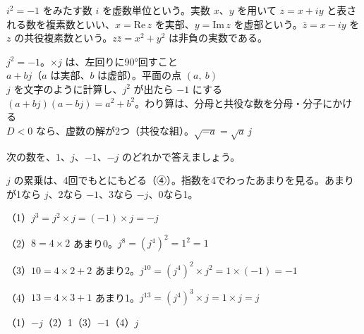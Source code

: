 \begin{senmonsho}[大学の教科書ふうの書き方]
\begin{bkhonbun}
$i^2=-1$ をみたす数 $i$ を虚数単位という。実数 $x$、$y$ を用いて $z=x+iy$ と表される数を複素数といい、$x=\mathrm{Re}\,z$ を実部、$y=\mathrm{Im}\,z$ を虚部という。$\bar z=x-iy$ を $z$ の共役複素数という。$z\bar z=x^2+y^2$ は非負の実数である。
\end{bkhonbun}
\end{senmonsho}

{}

\begin{taisetsu}
\def\tsl#1{\makebox[6.2\zw][l]{\sffamily\bfseries\small\color{\bkTT}#1}}
\tsl{虚数単位}$j^2=-1$。$\times j$ は、左回りに90°回すこと\\[3pt]
\tsl{複素数}$a+bj$（$a$ は実部、$b$ は虚部）。平面の点 $(a,\ b)$\\[3pt]
\tsl{計算}$j$ を文字のように計算し、$j^2$ が出たら $-1$ にする\\[3pt]
\tsl{共役}$(a+bj)(a-bj)=a^2+b^2$。わり算は、分母と共役な数を分母・分子にかける\\[3pt]
\tsl{2次方程式}$D<0$ なら、虚数の解が2つ（共役な組）。$\sqrt{-a}=\sqrt a\,j$
\end{taisetsu}




\begin{reidai}[$j$ の累乗]
次の数を、$1$、$j$、$-1$、$-j$ のどれかで答えましょう。\newline{}\par
\kangaekata $j$ の累乗は、4回でもとにもどる（④）。指数を4でわったあまりを見る。あまりが1なら $j$、2なら $-1$、3なら $-j$、0なら1。\par
\shiki{}\zw{} （1）$j^3=j^2\times j=(-1)\times j=-j$\par
\bkviiq （2）$8=4\times2$ あまり0。$j^8=(j^4)^2=1^2=1$\par
\bkviiq （3）$10=4\times2+2$ あまり2。$j^{10}=(j^4)^2\times j^2=1\times(-1)=-1$\par
\bkviiq （4）$13=4\times3+1$ あまり1。$j^{13}=(j^4)^3\times j=1\times j=j$\par
\kotae{}\zw{} （1）$-j$\quad（2）1\quad（3）$-1$\quad（4）$j$
\end{reidai}

